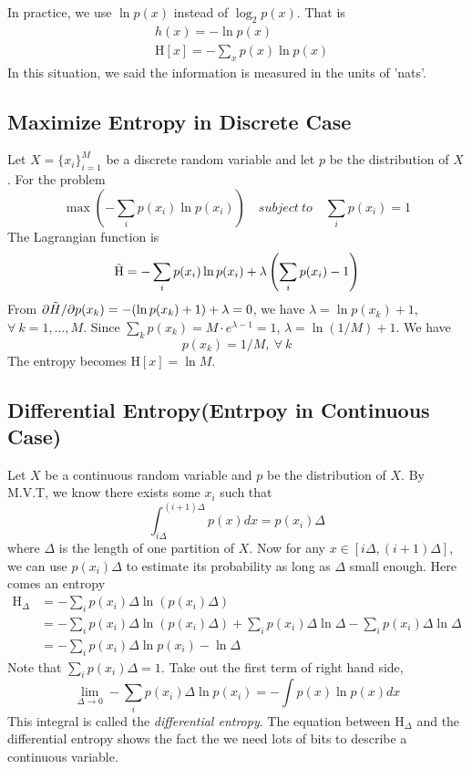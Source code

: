 \documentclass{article}
\begin{document}
            In practice, we use $\ln p(x)$ instead of $\log_2 p(x)$. That is
            \begin{align*}
                &h(x)=-\ln p(x)\\
                &\mathrm{H}[x] = -\sum_x p(x) \ln p(x)
            \end{align*}
            In this situation, we said the information is measured in the units of 'nats'.
        \subsection{Maximize Entropy in Discrete Case}
            Let $X=\{x_i\}_{i=1}^M$ be a discrete random variable and let $p$ be the distribution of $X$. For the problem
            \[
                \max \left(-\sum_i p(x_i)\ln p(x_i)\right) \quad subject~to \quad \sum_i p(x_i)=1
            \]
            The Lagrangian function is
            \[
                \Tilde{\mathrm{H}} = -\sum_i p(x_i)\ln p(x_i) + \lambda\left(\sum_i p(x_i) - 1\right)
            \]
            From $\partial\Tilde{H}/\partial p(x_k) = -(\ln p(x_k) + 1) + \lambda = 0$, we have $\lambda = \ln p(x_k) + 1$, $\forall~k=1,\dots,M$. Since $\sum_k p(x_k) = M\cdot e^{\lambda-1}=1$, $\lambda=\ln(1/M) + 1$. We have 
            \[
                p(x_k)=1/M,~\forall~k
            \]
            The entropy becomes $\mathrm{H}[x]=\ln M$.
            
        \subsection{Differential Entropy(Entrpoy in Continuous Case)}
            Let $X$ be a continuous random variable and $p$ be the distribution of $X$. By M.V.T, we know there exists some $x_i$ such that
            \[
                \int_{i\Delta}^{(i+1)\Delta}p(x)dx=p(x_i)\Delta
            \]
            where $\Delta$ is the length of one partition of $X$. Now for any $x\in[i\Delta,(i+1)\Delta]$, we can use $p(x_i)\Delta$ to estimate its probability as long as $\Delta$ small enough. Here comes an entropy
            \begin{align*}
                \mathrm{H}_{\Delta} &= -\sum_i p(x_i)\Delta\ln(p(x_i)\Delta)\\
                                    &= -\sum_i p(x_i)\Delta\ln(p(x_i)\Delta) + \sum_i p(x_i)\Delta\ln \Delta - \sum_i p(x_i)\Delta\ln \Delta\\
                                    &= -\sum_i p(x_i)\Delta\ln p(x_i) - \ln\Delta
            \end{align*}
            Note that $\sum_i p(x_i)\Delta=1$. Take out the first term of right hand side,
            \[
                \lim_{\Delta\rightarrow0}-\sum_i p(x_i)\Delta\ln p(x_i)= - \int p(x)\ln p(x)dx
            \]
            This integral is called the \textit{differential entropy}. The equation between $\mathrm{H}_\Delta$ and the differential entropy shows the fact the we need lots of bits to describe a continuous variable.
            
\end{document}
